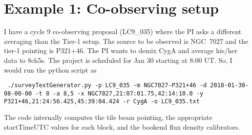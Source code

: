 \documentclass[a4paper,11pt]{article}
\begin{document}
\section*{Example 1: Co-observing setup}
I have a cycle 9 co-observing proposal (LC9\_035) where the PI asks a different averaging than the Tier-1 setup. The source to be observed is NGC~7027 and the tier-1 pointing is P321+46. The PI wants to demix CygA and average his/her data to 8ch5s. The project is scheduled for Jan 30 starting at 8:00 UT. So, I would run the python script as

\vspace{0.5cm}

\texttt{\
./surveyTextGenerator.py -p LC9\_035 -m NGC7027-P321+46 -d 2018-01-30-08-00-00 -t 8 -a 8,5 -x NGC7027,21:07:01.75,42:14:10.0 -y P321+46,21:24:56.425,45:39:04.424 -r CygA -o LC9\_035.txt
}

\vspace{0.5cm}

The code internally computes the tile beam pointing, the appropriate startTimeUTC values for each block, and the bookend flux density calibrators.
\end{document}
